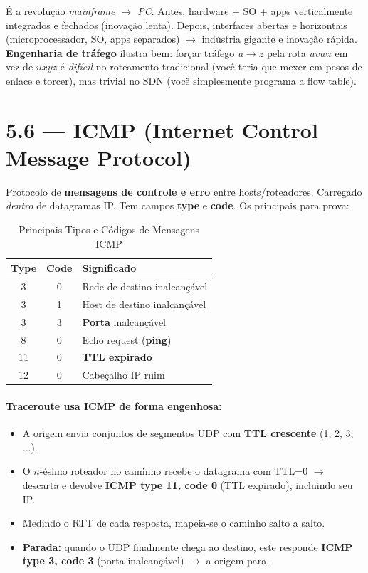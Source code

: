 \documentclass[11pt,a4paper]{article}
\begin{document}
\begin{analogia}
É a revolução \textit{mainframe $\to$ PC}. Antes, hardware + SO + apps verticalmente integrados e fechados (inovação lenta). Depois, interfaces abertas e horizontais (microprocessador, SO, apps separados) $\to$ indústria gigante e inovação rápida. \textbf{Engenharia de tráfego} ilustra bem: forçar tráfego $u \to z$ pela rota $uvwz$ em vez de $uxyz$ é \textit{difícil} no roteamento tradicional (você teria que mexer em pesos de enlace e torcer), mas trivial no SDN (você simplesmente programa a flow table).
\end{analogia}

\hrulefill

\section{5.6 --- ICMP (Internet Control Message Protocol)}

Protocolo de \textbf{mensagens de controle e erro} entre hosts/roteadores. Carregado \textit{dentro} de datagramas IP. Tem campos \textbf{type} e \textbf{code}. Os principais para prova:

\begin{table}[h!]
\centering
\caption{Principais Tipos e Códigos de Mensagens ICMP}
\label{tab:icmp}
\begin{tabular}{c c l}
\toprule
\textbf{Type} & \textbf{Code} & \textbf{Significado} \\
\midrule
3 & 0 & Rede de destino inalcançável \\
3 & 1 & Host de destino inalcançável \\
3 & 3 & \textbf{Porta} inalcançável \\
8 & 0 & Echo request (\textbf{ping}) \\
11 & 0 & \textbf{TTL expirado} \\
12 & 0 & Cabeçalho IP ruim \\
\bottomrule
\end{tabular}
\end{table}

\paragraph{Traceroute usa ICMP de forma engenhosa:}
\begin{itemize}
    \item A origem envia conjuntos de segmentos UDP com \textbf{TTL crescente} (1, 2, 3, ...).
    \item O $n$-ésimo roteador no caminho recebe o datagrama com TTL=0 $\to$ descarta e devolve \textbf{ICMP type 11, code 0} (TTL expirado), incluindo seu IP.
    \item Medindo o RTT de cada resposta, mapeia-se o caminho salto a salto.
    \item \textbf{Parada:} quando o UDP finalmente chega ao destino, este responde \textbf{ICMP type 3, code 3} (porta inalcançável) $\to$ a origem para.
\end{itemize}
\end{document}
